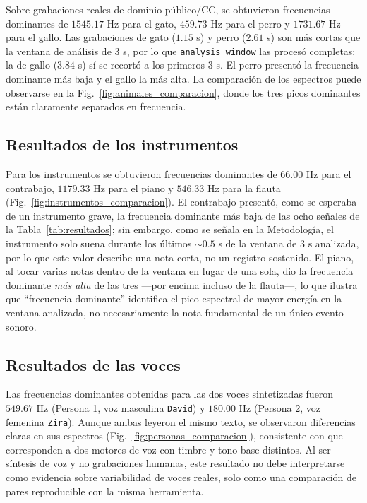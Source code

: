 Sobre grabaciones reales de dominio público/CC, se obtuvieron frecuencias dominantes de $1545.17$ Hz para el gato, $459.73$ Hz para el perro y $1731.67$ Hz para el gallo. Las grabaciones de gato ($1.15$ s) y perro ($2.61$ s) son más cortas que la ventana de análisis de $3$ s, por lo que \texttt{analysis\_window} las procesó completas; la de gallo ($3.84$ s) sí se recortó a los primeros $3$ s. El perro presentó la frecuencia dominante más baja y el gallo la más alta. La comparación de los espectros puede observarse en la Fig.~\ref{fig:animales_comparacion}, donde los tres picos dominantes están claramente separados en frecuencia.

\subsection{Resultados de los instrumentos}

Para los instrumentos se obtuvieron frecuencias dominantes de $66.00$ Hz para el contrabajo, $1179.33$ Hz para el piano y $546.33$ Hz para la flauta (Fig.~\ref{fig:instrumentos_comparacion}). El contrabajo presentó, como se esperaba de un instrumento grave, la frecuencia dominante más baja de las ocho señales de la Tabla~\ref{tab:resultados}; sin embargo, como se señala en la Metodología, el instrumento solo suena durante los últimos $\sim\!0.5$ s de la ventana de $3$ s analizada, por lo que este valor describe una nota corta, no un registro sostenido. El piano, al tocar varias notas dentro de la ventana en lugar de una sola, dio la frecuencia dominante \emph{más alta} de las tres —por encima incluso de la flauta—, lo que ilustra que ``frecuencia dominante'' identifica el pico espectral de mayor energía en la ventana analizada, no necesariamente la nota fundamental de un único evento sonoro.

\subsection{Resultados de las voces}

Las frecuencias dominantes obtenidas para las dos voces sintetizadas fueron $549.67$ Hz (Persona 1, voz masculina \texttt{David}) y $180.00$ Hz (Persona 2, voz femenina \texttt{Zira}). Aunque ambas leyeron el mismo texto, se observaron diferencias claras en sus espectros (Fig.~\ref{fig:personas_comparacion}), consistente con que corresponden a dos motores de voz con timbre y tono base distintos. Al ser síntesis de voz y no grabaciones humanas, este resultado no debe interpretarse como evidencia sobre variabilidad de voces reales, solo como una comparación de pares reproducible con la misma herramienta.

